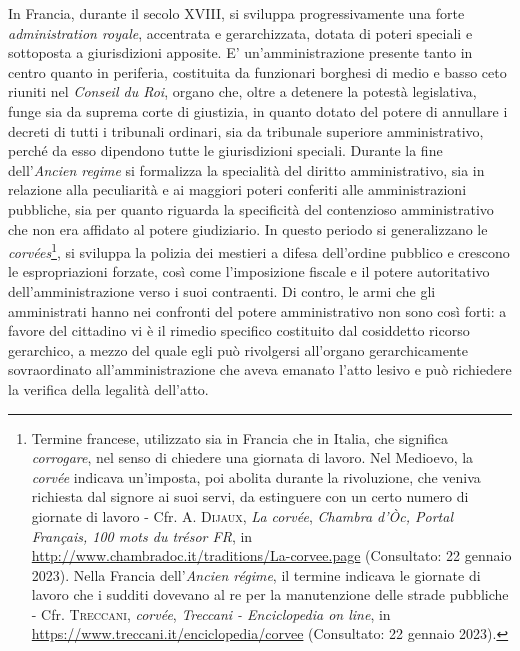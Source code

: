 \documentclass[12pt,it,a4paper,]{report}
\begin{document}
In Francia, durante il secolo XVIII, si sviluppa progressivamente una
forte \emph{administration royale}, accentrata e gerarchizzata, dotata
di poteri speciali e sottoposta a giurisdizioni apposite. E'
un'amministrazione presente tanto in centro quanto in periferia,
costituita da funzionari borghesi di medio e basso ceto riuniti nel
\emph{Conseil du Roi}, organo che, oltre a detenere la potestà
legislativa, funge sia da suprema corte di giustizia, in quanto dotato
del potere di annullare i decreti di tutti i tribunali ordinari, sia da
tribunale superiore amministrativo, perché da esso dipendono tutte le
giurisdizioni speciali. Durante la fine dell'\emph{Ancien regime} si
formalizza la specialità del diritto amministrativo, sia in relazione
alla peculiarità e ai maggiori poteri conferiti alle amministrazioni
pubbliche, sia per quanto riguarda la specificità del contenzioso
amministrativo che non era affidato al potere giudiziario. In questo
periodo si generalizzano le \emph{corvées}\footnote{Termine francese,
  utilizzato sia in Francia che in Italia, che significa
  \emph{corrogare}, nel senso di chiedere una giornata di lavoro. Nel
  Medioevo, la \emph{corvée} indicava un'imposta, poi abolita durante la
  rivoluzione, che veniva richiesta dal signore ai suoi servi, da
  estinguere con un certo numero di giornate di lavoro - Cfr. A.
  \textsc{Dijaux}, \emph{La corvée}, \emph{Chambra d'Òc, Portal
  Français, 100 mots du trésor FR}, in
  \url{http://www.chambradoc.it/traditions/La-corvee.page} (Consultato:
  22 gennaio 2023). Nella Francia dell'\emph{Ancien régime}, il termine
  indicava le giornate di lavoro che i sudditi dovevano al re per la
  manutenzione delle strade pubbliche - Cfr. \textsc{Treccani},
  \emph{corvée}, \emph{Treccani - Enciclopedia on line}, in
  \url{https://www.treccani.it/enciclopedia/corvee} (Consultato: 22
  gennaio 2023).}, si sviluppa la polizia dei mestieri a difesa
dell'ordine pubblico e crescono le espropriazioni forzate, così come
l'imposizione fiscale e il potere autoritativo dell'amministrazione
verso i suoi contraenti. Di contro, le armi che gli amministrati hanno
nei confronti del potere amministrativo non sono così forti: a favore
del cittadino vi è il rimedio specifico costituito dal cosiddetto
ricorso gerarchico, a mezzo del quale egli può rivolgersi all'organo
gerarchicamente sovraordinato all'amministrazione che aveva emanato
l'atto lesivo e può richiedere la verifica della legalità dell'atto.
\end{document}
